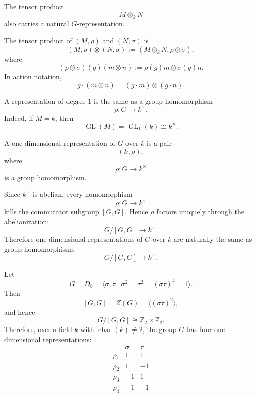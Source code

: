 The tensor product
\[
    M\otimes_k N
\]
also carries a natural \(G\)-representation.

\begin{definition}
    The tensor product of \((M,\rho)\) and \((N,\sigma)\) is
    \[
        (M,\rho)\otimes (N,\sigma)
        :=
        (M\otimes_k N,\rho\otimes\sigma),
    \]
    where
    \[
        (\rho\otimes\sigma)(g)(m\otimes n)
        :=
        \rho(g)m\otimes \sigma(g)n.
    \]
    In action notation,
    \[
        g\cdot(m\otimes n)=(g\cdot m)\otimes(g\cdot n).
    \]
\end{definition}

A representation of degree \(1\) is the same as a group homomorphism
\[
    \rho:G\longrightarrow k^\times.
\]
Indeed, if \(M=k\), then
\[
    \operatorname{GL}(M)=\operatorname{GL}_1(k)\cong k^\times.
\]

\begin{definition}
    A one-dimensional representation of \(G\) over \(k\) is a pair
    \[
        (k,\rho),
    \]
    where
    \[
        \rho:G\longrightarrow k^\times
    \]
    is a group homomorphism.
\end{definition}

\begin{remark}
    Since \(k^\times\) is abelian, every homomorphism
    \[
        \rho:G\longrightarrow k^\times
    \]
    kills the commutator subgroup \([G,G]\). Hence \(\rho\) factors uniquely
    through the abelianization:
    \[
        G/[G,G]\longrightarrow k^\times.
    \]
    Therefore one-dimensional representations of \(G\) over \(k\) are naturally
    the same as group homomorphisms
    \[
        G/[G,G]\longrightarrow k^\times.
    \]
\end{remark}

\begin{example}
    Let
    \[
        G=D_8=\langle \sigma,\tau\mid \sigma^2=\tau^2=(\sigma\tau)^4=1\rangle.
    \]
    Then
    \[
        [G,G]=Z(G)=\langle(\sigma\tau)^2\rangle,
    \]
    and hence
    \[
        G/[G,G]\cong \mathbb{Z}_2\times \mathbb{Z}_2.
    \]
    Therefore, over a field \(k\) with \(\operatorname{char}(k)\neq 2\), the group
    \(G\) has four one-dimensional representations:
    \[
    \begin{array}{c|cc}
        & \sigma & \tau \\ \hline
        \rho_1 & 1 & 1 \\
        \rho_2 & 1 & -1 \\
        \rho_3 & -1 & 1 \\
        \rho_4 & -1 & -1
    \end{array}
    \]
\end{example}

